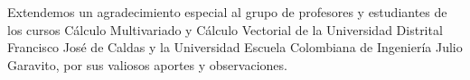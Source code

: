 
Extendemos un agradecimiento especial al grupo de profesores y estudiantes
de los cursos Cálculo Multivariado y Cálculo Vectorial de la Universidad Distrital Francisco José de Caldas y la Universidad Escuela Colombiana de Ingeniería Julio Garavito, por sus valiosos aportes y observaciones.
